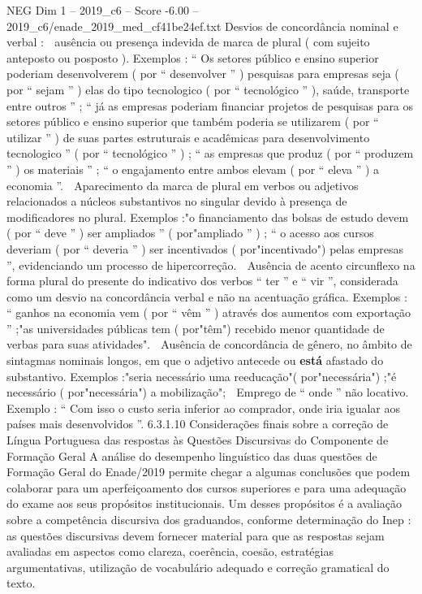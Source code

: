 \begin{textsample}{NEG Dim 1 – 2019\_c6 – Score -6.00 – 2019\_c6/enade\_2019\_med\_cf41be24ef.txt}
Desvios de concordância nominal e verbal :  ausência ou presença indevida de marca de plural ( com sujeito anteposto ou posposto ).
Exemplos : “ Os setores público e ensino superior poderiam desenvolverem ( por “ desenvolver ” ) pesquisas para empresas seja ( por “ sejam ” ) elas do tipo tecnologico ( por “ tecnológico ” ), saúde, transporte entre outros ” ; “ já as empresas poderiam financiar projetos de pesquisas para os setores público e ensino superior que também poderia se utilizarem ( por “ utilizar ” ) de suas partes estruturais e acadêmicas para desenvolvimento tecnologico ” ( por “ tecnológico ” ) ; “ as empresas que produz ( por “ produzem ” ) os materiais ” ; “ o engajamento entre ambos elevam ( por “ eleva ” ) a economia ”.  Aparecimento da marca de plural em verbos ou adjetivos relacionados a núcleos substantivos no singular devido à presença de modificadores no plural.
Exemplos :"o financiamento das bolsas de estudo devem ( por “ deve ” ) ser ampliados ” ( por"ampliado ” ) ; “ o acesso aos cursos deveriam ( por “ deveria ” ) ser incentivados ( por"incentivado") pelas empresas ”, evidenciando um processo de hipercorreção.  Ausência de acento circunflexo na forma plural do presente do indicativo dos verbos “ ter ” e “ vir ”, considerada como um desvio na concordância verbal e não na acentuação gráfica.
Exemplos : “ ganhos na economia vem ( por “ vêm ” ) através dos aumentos com exportação ” ;"as universidades públicas tem ( por"têm") recebido menor quantidade de verbas para suas atividades".  Ausência de concordância de gênero, no âmbito de sintagmas nominais longos, em que o adjetivo antecede ou \textbf{está} afastado do substantivo.
Exemplos :"seria necessário uma reeducação"( por"necessária") ;"é necessário ( por"necessária") a mobilização";  Emprego de “ onde ” não locativo.
Exemplo : “ Com isso o custo seria inferior ao comprador, onde iria igualar aos países mais desenvolvidos ”. 6.3.1.10 Considerações finais sobre a correção de Língua Portuguesa das respostas às Questões Discursivas do Componente de Formação Geral A análise do desempenho linguístico das duas questões de Formação Geral do Enade/2019 permite chegar a algumas conclusões que podem colaborar para um aperfeiçoamento dos cursos superiores e para uma adequação do exame aos seus propósitos institucionais.
Um desses propósitos é a avaliação sobre a competência discursiva dos graduandos, conforme determinação do Inep : as questões discursivas devem fornecer material para que as respostas sejam avaliadas em aspectos como clareza, coerência, coesão, estratégias argumentativas, utilização de vocabulário adequado e correção gramatical do texto.

\end{textsample}
